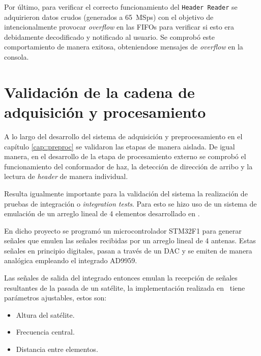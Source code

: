 \documentclass[../../main.tex]{subfiles}
\begin{document}
Por último, para verificar el correcto funcionamiento del \texttt{Header Reader} se adquirieron datos crudos (generados a 65~MSps) con el objetivo de intencionalmente provocar \textit{overflow} en las FIFOs para verificar si esto era debidamente decodificado y notificado al usuario. Se comprobó este comportamiento de manera exitosa, obteniendose mensajes de \textit{overflow} en la consola.





\section{Validación de la cadena de adquisición y procesamiento}
A lo largo del desarrollo del sistema de adquisición y preprocesamiento en el capítulo \ref{cap::preproc} se validaron las etapas de manera aislada. De igual manera, en el desarrollo de la etapa de procesamiento externo se comprobó el funcionamiento del conformador de haz, la detección de dirección de arribo y la lectura de \textit{header} de manera individual.

Resulta igualmente importante para la validación del sistema la realización de pruebas de integración o \textit{integration tests}. Para esto se hizo uso de un sistema de emulación de un arreglo lineal de 4 elementos desarrollado en \cite{proyecto-arce}.

En dicho proyecto se programó un microcontrolador STM32F1\cite{stm32f1} para generar señales que emulen las señales recibidas por un arreglo lineal de 4 antenas. Estas señales en principio digitales, pasan a través de un DAC y se emiten de manera analógica empleando el integrado AD9959\cite{ad9959}. 

Las señales de salida del integrado entonces emulan la recepción de señales resultantes de la pasada de un satélite, la implementación realizada en~\cite{proyecto-arce} tiene parámetros ajustables, estos son:
\begin{itemize}
    \item Altura del satélite.
    \item Frecuencia central.
    \item Distancia entre elementos.
\end{itemize}
\end{document}
